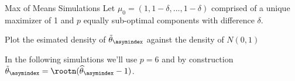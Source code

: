 \documentclass[aspectratio=169, professionalfonts, handout]{beamer}
\begin{document}
\begin{frame}{Max of Means Simulations}
	Let $\mu_0 = (1, 1-\delta, \ldots, 1-\delta)$ comprised of a unique maximizer of 1 and
	$p$ equally sub-optimal components with difference $\delta$.
	\begin{algorithm}[H]

		Plot the esimated density of $\tilde{\theta}_{\asymindex}$ against the density of $N(0,1)$
	\end{algorithm}
	\footnotesize In the following simulations we'll use $p = 6$ and by construction
	$\tilde{\theta}_{\asymindex}= \rootn
		(\widehat{\theta}_{\asymindex} - 1)$.







\end{frame}
\end{document}
